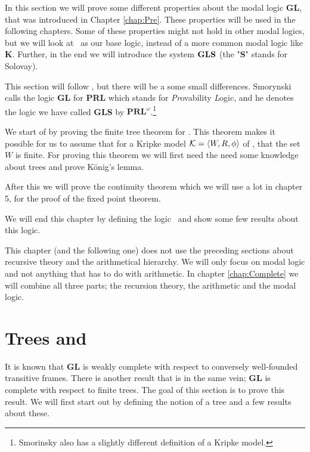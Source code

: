 \documentclass[../main.tex]{subfiles}
\begin{document}
In this section we will prove some different properties about the modal logic
\textbf{GL}, that was introduced in Chapter \ref{chap:Pre}.
These properties will be used in the following chapters. Some of these
properties might not
hold in other modal logics, but we will look at \GL\ as our base logic,
instead of a more common modal logic like \textbf{K}.
Further, in the end we will introduce the system $\text{\textbf{GLS}}$ (the
"\textbf{S}" stands for Solovay).

This section will follow \parencite{Smor1985}, but there will be a some small
differences. Smorynski calls the logic \textbf{GL} for \textbf{PRL} which
stands for \textit{Pr}ovability \textit{L}ogic, and he denotes the logic we
have called \textbf{GLS} by $\textbf{PRL}^\omega$.\footnote{Smorinsky also has a
slightly different definition of a Kripke model.}

We start of by proving the finite tree theorem for \GL. This theorem makes it
possible for us to assume that for a Kripke model $\mathcal{K}=\langle W,R,\phi\rangle$ of
\GL, that the set $W$ is finite. For proving this theorem we will first need
the need some knowledge about trees and
prove König's lemma.

After this we will prove the continuity theorem which we will use a lot in
chapter 5, for the proof of the fixed point theorem.

We will end this chapter by defining the logic \GLS\ and show some few results
about this logic.

This chapter (and the following one) does not use the preceding sections about
recursive theory and the arithmetical hierarchy. We will only
focus on modal logic and not anything that has to do with arithmetic. In
chapter \ref{chap:Complete} we will combine all three parts; the recursion
theory, the arithmetic and the modal logic.


\section{Trees and \GL}

It is known that \textbf{GL} is weakly complete with respect to conversely
well-founded transitive frames. There is another result that is in the same
vein; \textbf{GL} is complete with respect to finite trees. The goal of this
section is to prove this result. We will first start out by defining the notion
of a tree and a few results about these.
\end{document}
